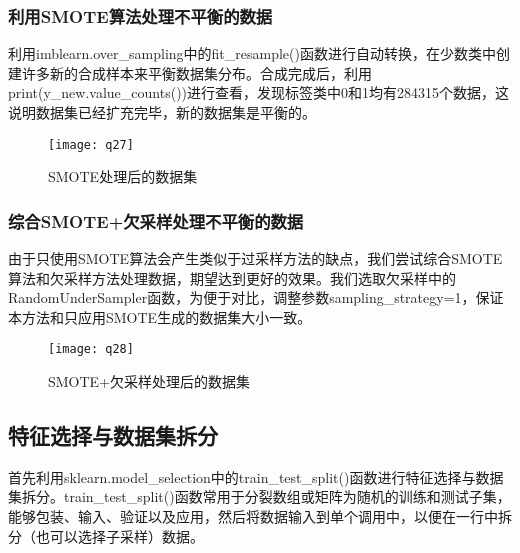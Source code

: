 \documentclass[a4paper,12pt]{article}
\begin{document}
\subsubsection{利用SMOTE算法处理不平衡的数据}
\begin{table}[h]
	\caption{SMOTE算法步骤}
\end{table}

利用imblearn.over\_sampling中的fit\_resample()函数进行自动转换，在少数类中创建许多新的合成样本来平衡数据集分布。合成完成后，利用print(y\_new.value\_counts())进行查看，发现标签类中0和1均有284315个数据，这说明数据集已经扩充完毕，新的数据集是平衡的。

\begin{figure}[h]%
	\centering%
	\texttt{[image: q27]}
	\caption{SMOTE处理后的数据集}
\end{figure}
\subsubsection{综合SMOTE+欠采样处理不平衡的数据}
由于只使用SMOTE算法会产生类似于过采样方法的缺点，我们尝试综合SMOTE算法和欠采样方法处理数据，期望达到更好的效果。我们选取欠采样中的RandomUnderSampler函数，为便于对比，调整参数sampling\_strategy=1，保证本方法和只应用SMOTE生成的数据集大小一致。
\begin{figure}[h]%
	\centering%
	\texttt{[image: q28]}
	\caption{SMOTE+欠采样处理后的数据集}
\end{figure}
\subsection{特征选择与数据集拆分}
首先利用sklearn.model\_selection中的train\_test\_split()函数进行特征选择与数据集拆分。train\_test\_split()函数常用于分裂数组或矩阵为随机的训练和测试子集，能够包装、输入、验证以及应用，然后将数据输入到单个调用中，以便在一行中拆分（也可以选择子采样）数据。
\end{document}
